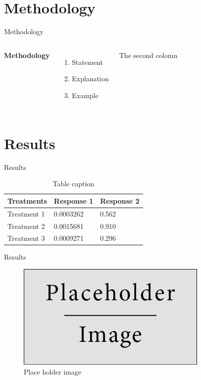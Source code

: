 \documentclass[9pt]{beamer}
\begin{document}
\section{Methodology}
\begin{frame}{Methodology}
  \begin{columns}[c] %

      \textbf{Methodology}
      \begin{enumerate}
        \item Statement
        \item Explanation
        \item Example
      \end{enumerate}

      The second colomn

  \end{columns}
\end{frame}

\section{Results}
\begin{frame}{Results}
  \begin{table}
    \begin{tabular}{l l l}
      \toprule
      \textbf{Treatments} & \textbf{Response 1} & \textbf{Response 2}\\
      \midrule
      Treatment 1 & 0.0003262 & 0.562 \\
      Treatment 2 & 0.0015681 & 0.910 \\
      Treatment 3 & 0.0009271 & 0.296 \\
      \bottomrule
    \end{tabular}
    \caption{Table caption}
  \end{table}
\end{frame}

\begin{frame}{Results}
      
  \begin{figure}
      \centering
      \includegraphics[width=.7\textwidth]{placeholder}
      \caption{Place holder image}
  \end{figure}

\end{frame}
\end{document}
